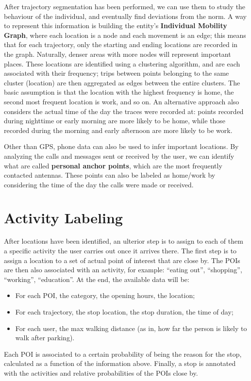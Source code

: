 After trajectory segmentation has been performed, we can use them to study the behaviour of the individual, and eventually find deviations from the norm. A way to represent this information is building the entity's \textbf{Individual Mobility Graph}, where each location is a node and each movement is an edge; this means that for each trajectory, only the starting and ending locations are recorded in the graph. Naturally, denser areas with more nodes will represent important places. These locations are identified using a clustering algorithm, and are each associated with their frequency; trips between points belonging to the same cluster (location) are then aggregated as edges between the entire clusters. The basic assumption is that the location with the highest frequency is home, the second most frequent location is work, and so on. An alternative approach also considers the actual time of the day the traces were recorded at: points recorded during nighttime or early morning are more likely to be home, while those recorded during the morning and early afternoon are more likely to be work.

Other than GPS, phone data can also be used to infer important locations. By analyzing the calls and messages sent or received by the user, we can identify what are called \textbf{personal anchor points}, which are the most frequently contacted antennas. These points can also be labeled as home/work by considering the time of the day the calls were made or received.

\section{Activity Labeling}

After locations have been identified, an ulterior step is to assign to each of them a specific activity the user carries out once it arrives there. The first step is to assign a location to a set of actual point of interest that are close by. The POIs are then also associated with an activity, for example: ``eating out'', ``shopping'', ``working'', ``education''. At the end, the available data will be:
\begin{itemize}[itemsep=-5pt, label=-]
    \item For each POI, the category, the opening hours, the location;
    \item For each trajectory, the stop location, the stop duration, the time of day;
    \item For each user, the max walking distance (as in, how far the person is likely to walk after parking).
\end{itemize}
Each POI is associated to a certain probability of being the reason for the stop, calculated as a function of the information above. Finally, a stop is annotated with the activities and relative probabilities of the POIs close by.


